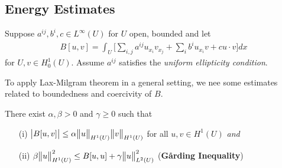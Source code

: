 \documentclass[10pt,a4paper]{report}
\begin{document}
\subsection*{Energy Estimates}

Suppose $a^{ij}, b^i, c \in L^{\infty}(U)$ for $U$ open, bounded and let
\begin{align*}
B[u,v] = \int_U \Big[ \sum_{i,j} a^{ij}u_{x_i}v_{x_j} + \sum_i b^i u_{x_i} v + cu\cdot v \Big] dx
\end{align*}
for $U,v\in H_0^1 (U)$. Assume $a^{ij}$ satisfies the \emph{uniform ellipticity condition}.
\s

To apply Lax-Milgram theorem in a general setting, we nee some estimates related to boundedness and coercivity of $B$. 
\s

\thm There exist $\alpha, \beta >0$ and $\gamma \geq 0$ such that
\begin{itemize}
\item[(i)] $\big| B[u,v]\big| \leq \alpha \bigl\lVert u\bigr\rVert_{H^1(U)} \bigl\lVert v\bigr\rVert_{H^1(U)}$ for all $u,v\in H^1(U)$ \quad \emph{and}
\item[(ii)] $\beta \bigl\lVert u\bigr\rVert_{H^1(U)}^2 \leq B[u,u] + \gamma \bigl\lVert u\bigr\rVert_{L^2(U)}^2$ (\textbf{G{\aa}rding Inequality})
\end{itemize}
\end{document}
